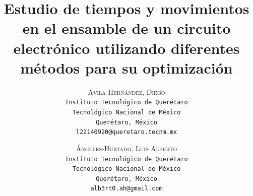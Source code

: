     \lfoot{ \thepage}
    
    \setlength{\droptitle}{-5\baselineskip} %
    \title{\textbf{Estudio de tiempos y movimientos en el ensamble de un circuito electrónico utilizando diferentes métodos para su optimización}} %
    
     \author{ 
     \textsc{Avila-Hernández, Diego}\\ 
     \texttt{ Instituto Tecnológico de Querétaro } \\ 
     \texttt{ Tecnológico Nacional de México } \\ 
     \texttt{Querétaro, México}\\ 
     \texttt{l22140920@queretaro.tecnm.mx} 
     \and 
     \textsc{Ángeles-Hurtado, Luis Alberto}\\ 
     \texttt{ Instituto Tecnológico de Querétaro } \\ 
     \texttt{ Tecnológico Nacional de México } \\ 
     \texttt{Querétaro, México}\\ 
     \texttt{alb3rt0.ah@gmail.com} 
    }
    
    
    
    
